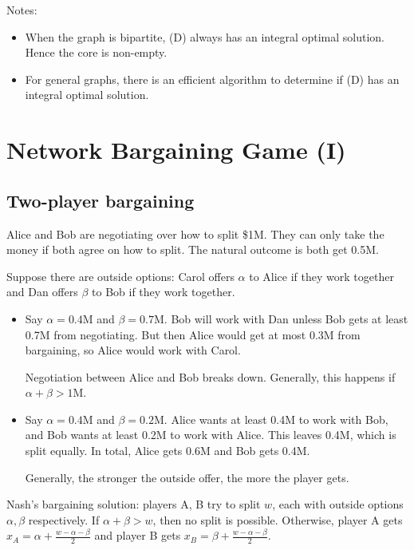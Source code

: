 \documentclass[12pt,letterpaper]{report}
\begin{document}
Notes:
\begin{itemize}
  \item
  When the graph is bipartite, (D) always has an integral optimal solution.
  Hence the core is non-empty.
  \item
  For general graphs, there is an efficient algorithm to determine if (D) has an integral optimal
  solution.
\end{itemize}

\section{Network Bargaining Game (I)}

\subsection{Two-player bargaining}

Alice and Bob are negotiating over how to split \$1M.
They can only take the money if both agree on how to split.
The natural outcome is both get 0.5M.

Suppose there are outside options: Carol offers $\alpha$ to Alice if they work together and Dan
offers $\beta$ to Bob if they work together.
\begin{itemize}
  \item
  Say $\alpha = 0.4$M and $\beta = 0.7$M.
  Bob will work with Dan unless Bob gets at least 0.7M from negotiating.
  But then Alice would get at most 0.3M from bargaining, so Alice would work with Carol.

  Negotiation between Alice and Bob breaks down.
  Generally, this happens if $\alpha + \beta > 1$M.

  \item
  Say $\alpha = 0.4$M and $\beta = 0.2$M.
  Alice wants at least 0.4M to work with Bob, and Bob wants at least 0.2M to work with Alice.
  This leaves 0.4M, which is split equally.
  In total, Alice gets 0.6M and Bob gets 0.4M.

  Generally, the stronger the outside offer, the more the player gets.
\end{itemize}

Nash's bargaining solution: players A, B try to split $w$, each with outside options $\alpha, \beta$
respectively.
If $\alpha + \beta > w$, then no split is possible.
Otherwise, player A gets $x_A = \alpha + \frac{w - \alpha - \beta}{2}$ and player B gets
$x_B = \beta + \frac{w - \alpha - \beta}{2}$.
\end{document}
